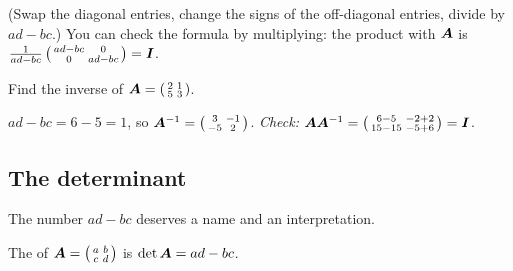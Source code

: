 (Swap the diagonal entries, change the signs of the off-diagonal entries,
divide by $ad - bc$.) You can check the formula by multiplying: the product
with $\bm{A}$ is $\frac{1}{ad - bc}\left(\begin{smallmatrix} ad - bc & 0\\ 0 & ad -
bc\end{smallmatrix}\right) = \bm{I}$.

\begin{example}\label{ex:inverse-2x2}
Find the inverse of $\bm{A} = \left(\begin{smallmatrix} 2 & 1\\ 5 &
3\end{smallmatrix}\right)$.

\sol $ad - bc = 6 - 5 = 1$, so
$\bm{A}^{-1} = \left(\begin{smallmatrix} 3 & -1\\ -5 & 2\end{smallmatrix}\right)$.
\emph{Check:} $\bm{A}\bm{A}^{-1} = \left(\begin{smallmatrix} 6 - 5 & -2 + 2\\ 15 - 15
& -5 + 6\end{smallmatrix}\right) = \bm{I}$. \checkmark
\end{example}

\subsection{The determinant}

The number $ad - bc$ deserves a name and an interpretation.

\begin{definition}\label{def:determinant}
The  of $\bm{A} = \left(\begin{smallmatrix} a & b\\ c &
d\end{smallmatrix}\right)$ is $\det\bm{A} = ad - bc$.
\end{definition}

